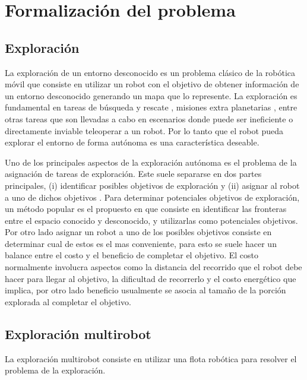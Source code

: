 \section{Formalización del problema}
\subsection{Exploración}
La exploración de un entorno desconocido es un problema clásico de la robótica móvil que consiste en utilizar un robot con el objetivo de obtener información de un entorno desconocido generando un mapa que lo represente. La exploración es fundamental en tareas de búsqueda y rescate \cite{Liu2015}, misiones extra planetarias \cite{schuster2019towards}, entre otras tareas que son llevadas a cabo en escenarios donde puede ser ineficiente o directamente inviable teleoperar a un robot. Por lo tanto que el robot pueda explorar el entorno de forma autónoma es una característica deseable.

Uno de los principales aspectos de la exploración autónoma es el problema de la asignación de tareas de exploración. Este suele separarse en dos partes principales, (i) identificar posibles objetivos de exploración y (ii) asignar al robot a uno de dichos objetivos \cite{amorin2019novel}. Para determinar potenciales objetivos de exploración, un método popular es el propuesto en \cite{yamauchi1998frontier} que consiste en identificar las fronteras entre el espacio conocido y desconocido, y utilizarlas como potenciales objetivos. Por otro lado asignar un robot a uno de los posibles objetivos consiste en determinar cual de estos es el mas conveniente, para esto se suele hacer un balance entre el costo y el beneficio de completar el objetivo. El costo normalmente involucra aspectos como la distancia del recorrido que el robot debe hacer para llegar al objetivo, la dificultad de recorrerlo y el costo energético que implica, por otro lado beneficio usualmente se asocia al tamaño de la porción explorada al completar el objetivo.
\subsection{Exploración multirobot}\label{subsec:expmutirob}
La exploración multirobot consiste en utilizar una flota robótica para resolver el problema de la exploración.


